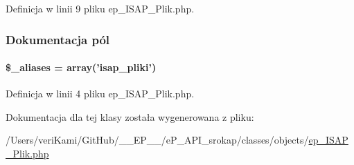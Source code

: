 Definicja w linii 9 pliku ep\-\_\-\-I\-S\-A\-P\-\_\-\-Plik.\-php.



\subsubsection{Dokumentacja pól}
\hypertarget{classep___i_s_a_p___plik_ab4e31d75f0bc5d512456911e5d01366b}{
\paragraph[{\$\-\_\-aliases}]{\setlength{\rightskip}{0pt plus 5cm}\$\-\_\-aliases = array('isap\-\_\-pliki')}}\label{classep___i_s_a_p___plik_ab4e31d75f0bc5d512456911e5d01366b}


Definicja w linii 4 pliku ep\-\_\-\-I\-S\-A\-P\-\_\-\-Plik.\-php.



Dokumentacja dla tej klasy została wygenerowana z pliku\-:\begin{DoxyCompactItemize}
\item 
/\-Users/veri\-Kami/\-Git\-Hub/\-\_\-\-\_\-\-E\-P\-\_\-\-\_\-/e\-P\-\_\-\-A\-P\-I\-\_\-srokap/classes/objects/\hyperlink{ep___i_s_a_p___plik_8php}{ep\-\_\-\-I\-S\-A\-P\-\_\-\-Plik.\-php}\end{DoxyCompactItemize}
